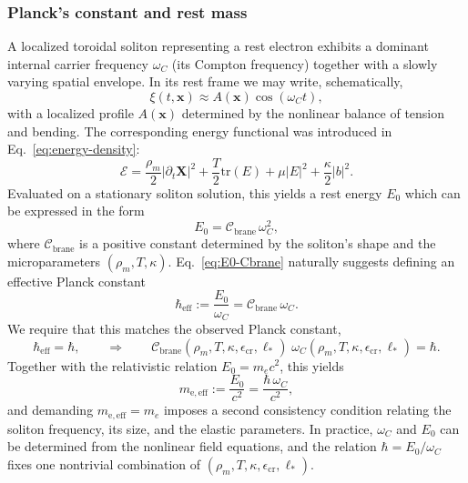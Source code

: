 \subsubsection{Planck's constant and rest mass}

A localized toroidal soliton representing a rest electron exhibits a dominant internal carrier frequency $\omega_C$ (its Compton frequency) together with a slowly varying spatial envelope.
In its rest frame we may write, schematically,
%
\begin{equation}
  \xi(t,\mathbf{x}) \approx A(\mathbf{x}) \cos(\omega_C t),
\end{equation}
%
with a localized profile $A(\mathbf{x})$ determined by the nonlinear balance of tension and bending.
The corresponding energy functional was introduced in Eq.~\eqref{eq:energy-density}:
%
\begin{equation}
  \mathcal{E}=\frac{\rho_m}{2}|\partial_t\mathbf{X}|^2
  +\frac{T}{2}\mathrm{tr}(E)
  +\mu|E|^2
  +\frac{\kappa}{2}|b|^2.
  \label{eq:energy-functional-param}
\end{equation}
%
Evaluated on a stationary soliton solution, this yields a rest energy $E_0$ which can be expressed in the form
%
\begin{equation}
  E_0 = \mathcal{C}_{\mathrm{brane}} \,\omega_C^2,
  \label{eq:E0-Cbrane}
\end{equation}
%
where $\mathcal{C}_{\mathrm{brane}}$ is a positive constant determined by the soliton's shape and the microparameters $(\rho_m, T, \kappa)$.
Eq.~\eqref{eq:E0-Cbrane} naturally suggests defining an effective Planck constant
%
\begin{equation}
  \hbar_{\mathrm{eff}} := \frac{E_0}{\omega_C}
  = \mathcal{C}_{\mathrm{brane}} \,\omega_C.
  \label{eq:hbar-eff}
\end{equation}
%
We require that this matches the observed Planck constant,
%
\begin{equation}
  \hbar_{\mathrm{eff}} = \hbar,
  \qquad\Rightarrow\qquad
  \mathcal{C}_{\mathrm{brane}}(\rho_m, T, \kappa, \epsilon_{\mathrm{cr}}, \ell_\ast)\;
  \omega_C(\rho_m, T, \kappa, \epsilon_{\mathrm{cr}}, \ell_\ast) = \hbar.
  \label{eq:hbar-matching}
\end{equation}
%
Together with the relativistic relation $E_0 = m_e c^2$, this yields
%
\begin{equation}
  m_{\mathrm{e,eff}} := \frac{E_0}{c^2}
  = \frac{\hbar \,\omega_C}{c^2},
\end{equation}
%
and demanding $m_{\mathrm{e,eff}} = m_e$ imposes a second consistency condition relating the soliton frequency, its size, and the elastic parameters.
In practice, $\omega_C$ and $E_0$ can be determined from the nonlinear field equations, and the relation
$\hbar = E_0/\omega_C$ fixes one nontrivial combination of $(\rho_m,T,\kappa,\epsilon_{\mathrm{cr}},\ell_\ast)$.

